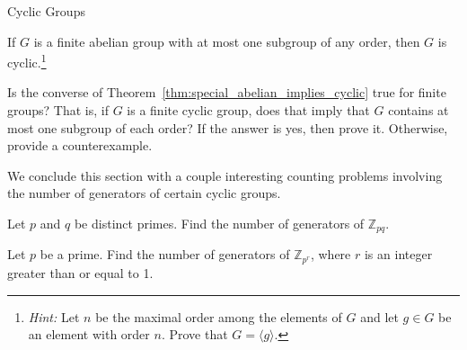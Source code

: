 \begin{section}{Cyclic Groups}
\begin{theorem}\label{thm:special_abelian_implies_cyclic}
If $G$ is a finite abelian group with at most one subgroup of any order, then $G$ is cyclic.\footnote{\emph{Hint:} Let $n$ be the maximal order among the elements of $G$ and let $g\in G$ be an element with order $n$. Prove that $G=\langle g\rangle$.}
\end{theorem}

\begin{problem}
Is the converse of Theorem~\ref{thm:special_abelian_implies_cyclic} true for finite groups?  That is, if $G$ is a finite cyclic group, does that imply that $G$ contains at most one subgroup of each order? If the answer is yes, then prove it.  Otherwise, provide a counterexample.
\end{problem}

We conclude this section with a couple interesting counting problems involving the number of generators of certain cyclic groups.

\begin{problem}
Let $p$ and $q$ be distinct primes. Find the number of generators of $\mathbb{Z}_{pq}$.
\end{problem}

\begin{problem}
Let $p$ be a prime. Find the number of generators of $\mathbb{Z}_{p^r}$, where $r$ is an integer greater than or equal to 1.
\end{problem}

\end{section}

